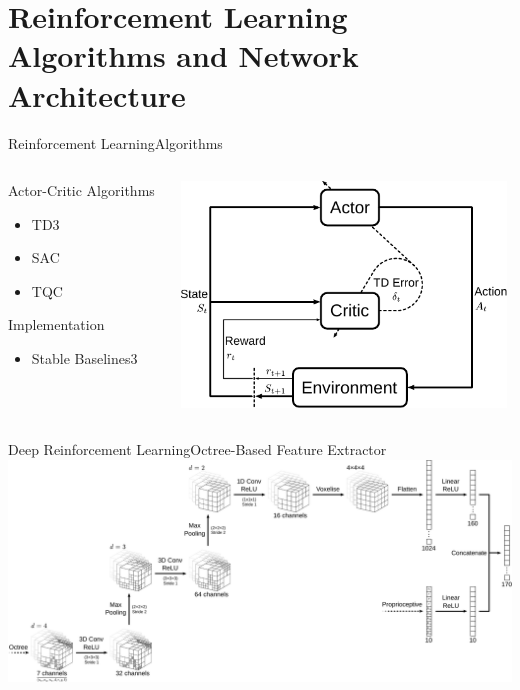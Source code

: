 \section{Reinforcement Learning Algorithms and Network Architecture}

\begin{frame}{Reinforcement Learning}{Algorithms}
    \begin{columns}%
        \begin{column}{0.3\textwidth}%
            \begin{block}{Actor-Critic Algorithms}
                \begin{itemize}
                    \item TD3
                    \item SAC
                    \item TQC
                \end{itemize}
            \end{block}
            \begin{block}{Implementation}
                \begin{itemize}
                    \item Stable Baselines3
                \end{itemize}
            \end{block}
        \end{column}
        \begin{column}{0.7\textwidth}%
            \centering
            \includegraphics[height=6cm]{graphics/actor_critic_loop.pdf}
        \end{column}
    \end{columns}
\end{frame}

\begin{frame}{Deep Reinforcement Learning}{Octree-Based Feature Extractor}
    \centering
    \includegraphics[width=\textwidth]{graphics/feature_extractor.pdf}
\end{frame}


